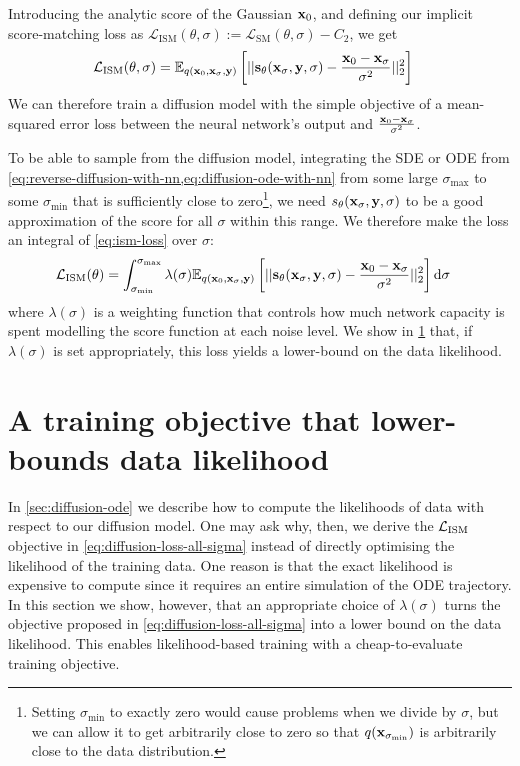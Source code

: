 Introducing the analytic score of the Gaussian ${\mathbf{x}}_0$, and defining our implicit score-matching loss as $\mathcal{L}_\text{ISM}(\theta, \sigma) := \mathcal{L}_\text{SM}(\theta, \sigma) - C_2$, we get
\begin{align} \label{eq:ism-loss}
    \mathcal{L}_\text{ISM}(\theta, \sigma) &= \mathbb{E}_{q({\mathbf{x}}_0, {\mathbf{x}}_\sigma, {\mathbf{y}})} \left[ 
    || {\mathbf{s}}_\theta({\mathbf{x}}_\sigma, {\mathbf{y}}, \sigma) - \frac{{\mathbf{x}}_0-{\mathbf{x}}_\sigma}{\sigma^2} ||_2^2 \right]
\end{align}
We can therefore train a diffusion model with the simple objective of a mean-squared error loss between the neural network's output and $\frac{{\mathbf{x}}_0-{\mathbf{x}}_\sigma}{\sigma^2}$.

To be able to sample from the diffusion model, integrating the SDE or ODE from \cref{eq:reverse-diffusion-with-nn,eq:diffusion-ode-with-nn} from some large $\sigma_\text{max}$ to some $\sigma_\text{min}$ that is sufficiently close to zero\footnote{Setting $\sigma_\text{min}$ to exactly zero would cause problems when we divide by $\sigma$, but we can allow it to get arbitrarily close to zero so that $q({\mathbf{x}}_{\sigma_\text{min}})$ is arbitrarily close to the data distribution.}, we need $s_\theta({\mathbf{x}}_\sigma, {\mathbf{y}}, \sigma)$ to be a good approximation of the score for all $\sigma$ within this range. We therefore make the loss an integral of \cref{eq:ism-loss} over $\sigma$:
\begin{align} \label{eq:diffusion-loss-all-sigma}
    \mathcal{L}_\text{ISM}(\theta) &= \int_{\sigma_\text{min}}^{\sigma_\text{max}} \lambda(\sigma) \mathbb{E}_{q({\mathbf{x}}_0, {\mathbf{x}}_\sigma, {\mathbf{y}})} \left[ 
    || {\mathbf{s}}_\theta({\mathbf{x}}_\sigma, {\mathbf{y}}, \sigma) - \frac{{\mathbf{x}}_0-{\mathbf{x}}_\sigma}{\sigma^2} ||_2^2 \right] \mathrm{d}\sigma
\end{align}
where $\lambda(\sigma)$ is a weighting function that controls how much network capacity is spent modelling the score function at each noise level. We show in \cref{sec:diffusion-likelihood} that, if $\lambda(\sigma)$ is set appropriately, this loss yields a lower-bound on the data likelihood.

\section{A training objective that lower-bounds data likelihood} \label{sec:diffusion-likelihood}
In \cref{sec:diffusion-ode} we describe how to compute the likelihoods of data with respect to our diffusion model. One may ask why, then, we derive the ${\mathcal{L}}_\text{ISM}$ objective in \cref{eq:diffusion-loss-all-sigma} instead of directly optimising the likelihood of the training data. One reason is that the exact likelihood is expensive to compute since it requires an entire simulation of the ODE trajectory. In this section we show, however, that an appropriate choice of $\lambda(\sigma)$ turns the objective proposed in \cref{eq:diffusion-loss-all-sigma} into a lower bound on the data likelihood. This enables likelihood-based training with a cheap-to-evaluate training objective.


